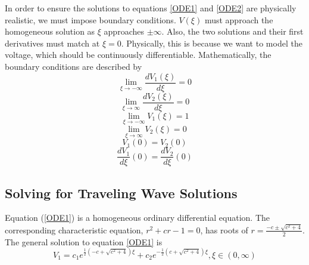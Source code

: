 \documentclass[12pt]{article}
\begin{document}
In order to ensure the solutions to equations \ref{ODE1} and \ref{ODE2} are physically realistic, we must impose boundary conditions. $V(\xi)$ must approach the homogeneous solution as $\xi$ approaches $\pm \infty$. Also, the two solutions and their first derivatives must match at $\xi=0$. Physically, this is because we want to model the voltage, which should be continuously differentiable. Mathematically, the boundary conditions are described by\\
$$\lim_{\xi\to-\infty} \frac{d V_1(\xi)}{d \xi}=0$$
$$\lim_{\xi\to\infty} \frac{d V_2(\xi)}{d \xi}=0$$
$$\lim_{\xi\to-\infty} V_1(\xi)=1$$
$$\lim_{\xi\to\infty} V_2(\xi)=0$$
$$V_1(0)=V_2(0)$$
$$\frac{d V_1}{d \xi}(0)=\frac{d V_2}{d \xi}(0)$$


\subsection{Solving for Traveling Wave Solutions}

Equation (\ref{ODE1}) is a homogeneous ordinary differential equation. The corresponding characteristic equation, $r^2+cr-1=0$, has roots of  $r=\frac{-c \pm \sqrt{c^2+4}}{2}$. The general solution to equation \ref{ODE1} is 
\begin{equation}
\label{ODE1 general solution}
V_{1}=c_1 e^{\frac{1}{2}(-c+\sqrt{c^2+4})\xi}+c_2e^{-\frac{1}{2}(c+\sqrt{c^2+4})\xi}, \xi \in (0,\infty)
\end{equation}
\end{document}
